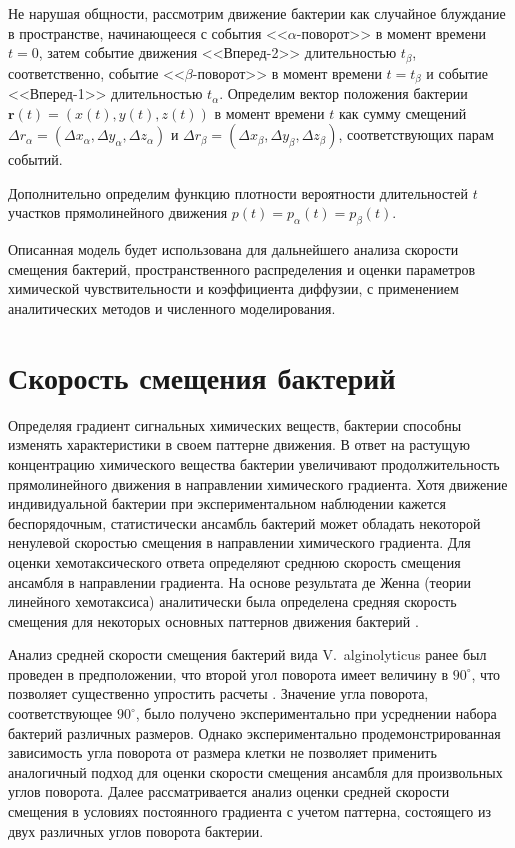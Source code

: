 Не нарушая общности, рассмотрим движение бактерии как случайное блуждание в пространстве, начинающееся с события <<$\alpha$-поворот>> в момент времени $t=0$, затем событие движения <<Вперед-2>> длительностью $t_{\beta}$, соответственно, событие <<$\beta$-поворот>> в момент времени $t=t_{\beta}$ и событие <<Вперед-1>> длительностью $t_{\alpha}$. Определим вектор положения бактерии $\textbf{r}(t)=(x(t),y(t),z(t))$ в момент времени $t$ как сумму смещений $\Delta r_{\alpha}=(\Delta x_{\alpha},\Delta y_{\alpha},\Delta z_{\alpha})$ и $\Delta r_{\beta}=(\Delta x_{\beta},\Delta y_{\beta},\Delta z_{\beta})$, соответствующих парам событий. 

Дополнительно определим функцию плотности вероятности длительностей $t$ участков прямолинейного движения $p(t)=p_{\alpha}(t)=p_{\beta}(t)$. 

Описанная модель будет использована для дальнейшего анализа скорости смещения бактерий, пространственного распределения и оценки параметров химической чувствительности и коэффициента диффузии, с применением аналитических методов и численного моделирования. 

\section{Скорость смещения бактерий}\label{sec:ch2/sec3}

Определяя градиент сигнальных химических веществ, бактерии способны изменять характеристики в своем паттерне движения. В ответ на растущую концентрацию химического вещества бактерии увеличивают продолжительность прямолинейного движения в направлении химического градиента. Хотя движение индивидуальной бактерии при экспериментальном наблюдении кажется беспорядочным, статистически ансамбль бактерий может обладать некоторой ненулевой скоростью смещения в направлении химического градиента. Для оценки хемотаксического ответа определяют среднюю скорость смещения ансамбля в направлении градиента. На основе результата де Женна (теории линейного хемотаксиса) аналитически была определена средняя скорость смещения для некоторых основных паттернов движения бактерий \cite{taktikos_how_2013,de_gennes_chemotaxis_2004,locsei_persistence_2007}. 

Анализ средней скорости смещения бактерий вида V.~alginolyticus ранее был проведен в предположении, что второй угол поворота имеет величину в $90^\circ$, что позволяет существенно упростить расчеты \cite{taktikos_how_2013}. Значение угла поворота, соответствующее $90^\circ$, было получено экспериментально при усреднении набора бактерий различных размеров. Однако экспериментально продемонстрированная зависимость угла поворота от размера клетки \cite{taute_high-throughput_2015} не позволяет применить аналогичный подход для оценки скорости смещения ансамбля для произвольных углов поворота. Далее рассматривается анализ оценки средней скорости смещения в условиях постоянного градиента с учетом паттерна, состоящего из двух различных углов поворота бактерии.

